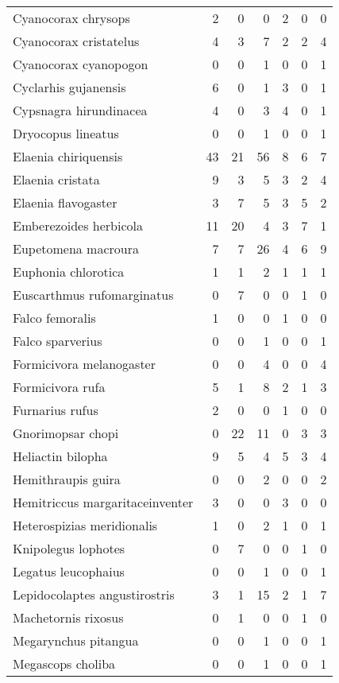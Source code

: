 \begin{table}[ht]
\begin{tabular}{lrrrrrr}
  Cyanocorax chrysops & 2 & 0 & 0 & 2 & 0 & 0 \\ 
  Cyanocorax cristatelus & 4 & 3 & 7 & 2 & 2 & 4 \\ 
  Cyanocorax cyanopogon & 0 & 0 & 1 & 0 & 0 & 1 \\ 
  Cyclarhis gujanensis & 6 & 0 & 1 & 3 & 0 & 1 \\ 
  Cypsnagra hirundinacea & 4 & 0 & 3 & 4 & 0 & 1 \\ 
  Dryocopus lineatus & 0 & 0 & 1 & 0 & 0 & 1 \\ 
  Elaenia chiriquensis & 43 & 21 & 56 & 8 & 6 & 7 \\ 
  Elaenia cristata & 9 & 3 & 5 & 3 & 2 & 4 \\ 
  Elaenia flavogaster & 3 & 7 & 5 & 3 & 5 & 2 \\ 
  Emberezoides herbicola & 11 & 20 & 4 & 3 & 7 & 1 \\ 
  Eupetomena macroura & 7 & 7 & 26 & 4 & 6 & 9 \\ 
  Euphonia chlorotica & 1 & 1 & 2 & 1 & 1 & 1 \\ 
  Euscarthmus rufomarginatus & 0 & 7 & 0 & 0 & 1 & 0 \\ 
  Falco femoralis & 1 & 0 & 0 & 1 & 0 & 0 \\ 
  Falco sparverius & 0 & 0 & 1 & 0 & 0 & 1 \\ 
  Formicivora melanogaster & 0 & 0 & 4 & 0 & 0 & 4 \\ 
  Formicivora rufa & 5 & 1 & 8 & 2 & 1 & 3 \\ 
  Furnarius rufus & 2 & 0 & 0 & 1 & 0 & 0 \\ 
  Gnorimopsar chopi & 0 & 22 & 11 & 0 & 3 & 3 \\ 
  Heliactin bilopha & 9 & 5 & 4 & 5 & 3 & 4 \\ 
  Hemithraupis guira & 0 & 0 & 2 & 0 & 0 & 2 \\ 
  Hemitriccus margaritaceinventer & 3 & 0 & 0 & 3 & 0 & 0 \\ 
  Heterospizias meridionalis & 1 & 0 & 2 & 1 & 0 & 1 \\ 
  Knipolegus lophotes & 0 & 7 & 0 & 0 & 1 & 0 \\ 
  Legatus leucophaius & 0 & 0 & 1 & 0 & 0 & 1 \\ 
  Lepidocolaptes angustirostris & 3 & 1 & 15 & 2 & 1 & 7 \\ 
  Machetornis rixosus & 0 & 1 & 0 & 0 & 1 & 0 \\ 
  Megarynchus pitangua & 0 & 0 & 1 & 0 & 0 & 1 \\ 
  Megascops choliba & 0 & 0 & 1 & 0 & 0 & 1 \\ 

\end{tabular}
\end{table}
